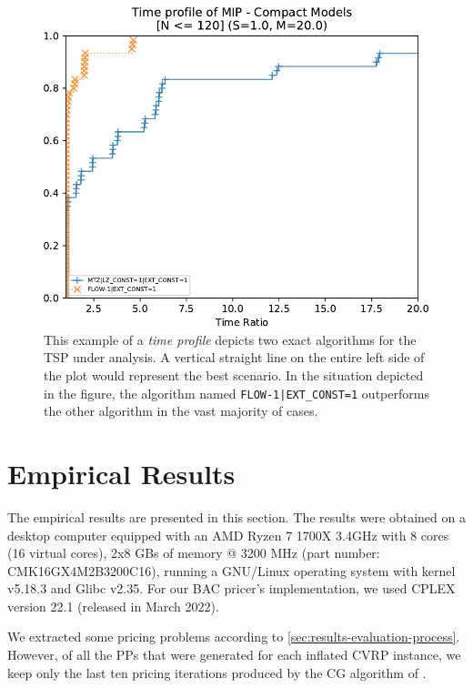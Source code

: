 \begin{figure}[t]
	\centering
	\includegraphics[width=\textwidth]{./Imgs/perfprof-tsp-example/time-ratio20.0.cropped.pdf}
	\caption{
		This example of a \textit{time profile} depicts two exact algorithms for the TSP under analysis.
		A vertical straight line on the entire left side of the plot would represent the best scenario.
		In the situation depicted in the figure, the algorithm named \texttt{FLOW-1|EXT\_CONST=1} outperforms the other algorithm in the vast majority of cases.
	}
	\label{fig:example-of-time-profile-tsp}
\end{figure}

\section{Empirical Results}
\label{sec:results-empirical-results}

The empirical results are presented in this section.
The results were obtained on a desktop computer equipped with
an AMD Ryzen 7 1700X 3.4GHz with 8 cores (16 virtual cores),
2x8 GBs of memory @ 3200 MHz (part number: CMK16GX4M2B3200C16),
running a GNU/Linux operating system with kernel v5.18.3 and Glibc v2.35.
For our BAC pricer's implementation, we used CPLEX version 22.1 (released in March 2022).

We extracted some pricing problems according to \cref{sec:results-evaluation-process}.
However, of all the PPs that were generated for each inflated CVRP instance,
we keep only the last ten pricing iterations produced by the CG algorithm of \bapcod{}.

